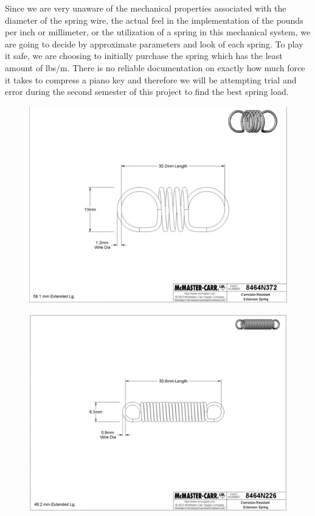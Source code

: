 Since we are very unaware of the mechanical properties associated with the diameter of the spring wire, the actual feel in the implementation of the pounds per inch or millimeter, or the utilization of a spring in this mechanical system, we are going to decide by approximate parameters and look of each spring. To play it safe, we are choosing to initially purchase the spring which has the least amount of lbs/m. There is no reliable documentation on exactly how much force it takes to compress a piano key and therefore we will be attempting trial and error during the second semester of this project to find the best spring load.

\newpage
\begin{figure}[h!]
  \centering
  \includegraphics[width=\linewidth]{image/Spring1.png}
  \caption{}
  \label{fig:spring1}
\end{figure}

\newpage
\begin{figure}[h!]
  \centering
  \includegraphics[width=\linewidth]{image/Spring2.png}
  \caption{}
  \label{fig:spring2}
\end{figure}

